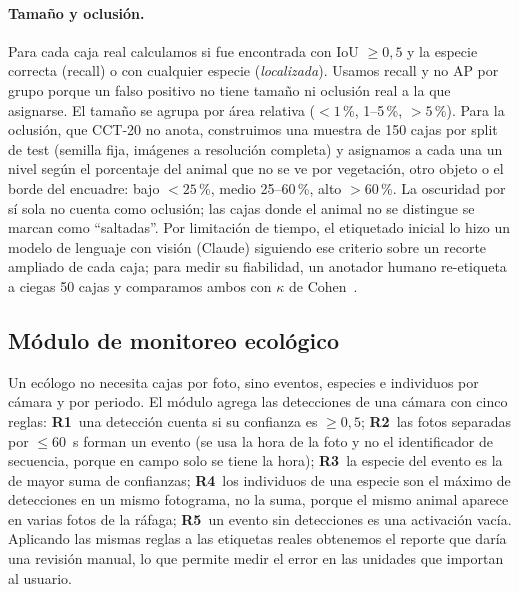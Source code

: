 \documentclass{article}
\begin{document}
\paragraph{Tamaño y oclusión.} Para cada caja real calculamos si fue encontrada
con IoU $\geq 0{,}5$ y la especie correcta (recall) o con cualquier especie
(\emph{localizada}). Usamos recall y no AP por grupo porque un falso positivo
no tiene tamaño ni oclusión real a la que asignarse. El tamaño se agrupa por
área relativa ($<1$\,\%, 1--5\,\%, $>5$\,\%). Para la oclusión, que CCT-20 no
anota, construimos una muestra de 150 cajas por split de test (semilla fija,
imágenes a resolución completa) y asignamos a cada una un nivel según el
porcentaje del animal que no se ve por vegetación, otro objeto o el borde del
encuadre: bajo $<25$\,\%, medio 25--60\,\%, alto $>60$\,\%. La oscuridad por sí
sola no cuenta como oclusión; las cajas donde el animal no se distingue se
marcan como ``saltadas''. Por limitación de tiempo, el etiquetado inicial lo
hizo un modelo de lenguaje con visión (Claude) siguiendo ese criterio sobre un
recorte ampliado de cada caja; para medir su fiabilidad, un anotador humano
re-etiqueta a ciegas 50 cajas y comparamos ambos con $\kappa$ de
Cohen~\cite{cohen1960kappa}.

\subsection{Módulo de monitoreo ecológico}

Un ecólogo no necesita cajas por foto, sino eventos, especies e individuos por
cámara y por periodo. El módulo agrega las detecciones de una cámara con cinco
reglas:
\textbf{R1}~una detección cuenta si su confianza es $\geq 0{,}5$;
\textbf{R2}~las fotos separadas por $\leq 60$~s forman un evento (se usa la
hora de la foto y no el identificador de secuencia, porque en campo solo se
tiene la hora);
\textbf{R3}~la especie del evento es la de mayor suma de confianzas;
\textbf{R4}~los individuos de una especie son el máximo de detecciones en un
mismo fotograma, no la suma, porque el mismo animal aparece en varias fotos de
la ráfaga;
\textbf{R5}~un evento sin detecciones es una activación vacía.
Aplicando las mismas reglas a las etiquetas reales obtenemos el reporte que
daría una revisión manual, lo que permite medir el error en las unidades que
importan al usuario.



\end{document}

